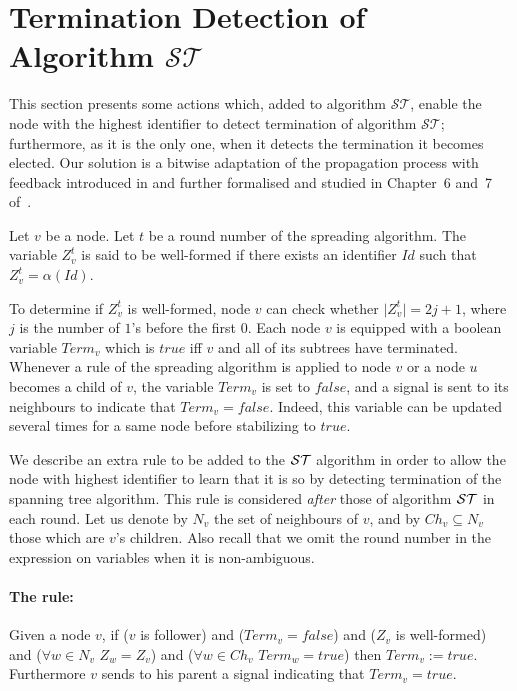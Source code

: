 \documentclass[11pt,envcountsame,letterpaper]{llncs}
\begin{document}
\section{Termination Detection of Algorithm $\mathcal {ST}$}
\label{sec:STT}
This section presents some actions  which, added to algorithm
${\mathcal {ST}}$, enable  the node with the highest identifier to detect
termination of algorithm ${\mathcal {ST}}$; furthermore, as it is the only one,
when it detects the termination it becomes elected.
Our solution is a bitwise adaptation of the propagation process with feedback introduced in \cite{S} and further formalised and studied in Chapter~6 and~7
of~\cite{Tel}. 

\begin{definition}
Let $v$ be a node. Let $t$ be a round number of the spreading
algorithm. The variable $Z_v^t$ is said to be
well-formed if there exists an identifier $Id$
 such that $Z_v^t=\alpha(Id)$.
\end{definition}

To determine if $Z_v^t$ is well-formed, node $v$ can check whether $\mid Z_v^t\mid = 2j+1$, where $j$ is the number of $1$'s before the first $0$.
Each node $v$ is equipped with a boolean variable 
$Term_v$ which is $true$ iff $v$ and all of its subtrees have terminated.
Whenever a rule of the spreading algorithm is applied to node $v$
or a node $u$ becomes a child of $v$,
the variable $Term_v$ is set to $false$, and a signal is sent to its 
neighbours to indicate that $Term_v=false$. Indeed, this variable can be updated
several times for a same node before stabilizing to $true$. 

We describe an extra rule to be added to the 
$\cal ST$ algorithm in order to allow the node
with highest identifier to learn that it is so by detecting
termination of the spanning tree  algorithm.
This rule is considered {\em after} those of algorithm $\cal ST$ in each round.
Let us denote by $N_v$ the set of neighbours of $v$, and by $Ch_v \subseteq N_v$ those which are $v$'s children. Also recall that we omit the round number in the expression on variables when it is non-ambiguous.

\paragraph{The rule:} Given a node $v$, if ($v$ is follower) and ($Term_v=false$)
and ($Z_v$ is well-formed)
and ($\forall w\in N_v$ $Z_w=Z_v$) and ($\forall w\in Ch_v$ $ Term_w=true$)
then $Term_v:=true$.
Furthermore $v$ sends to his parent a signal indicating that $Term_v=true$.
\end{document}
